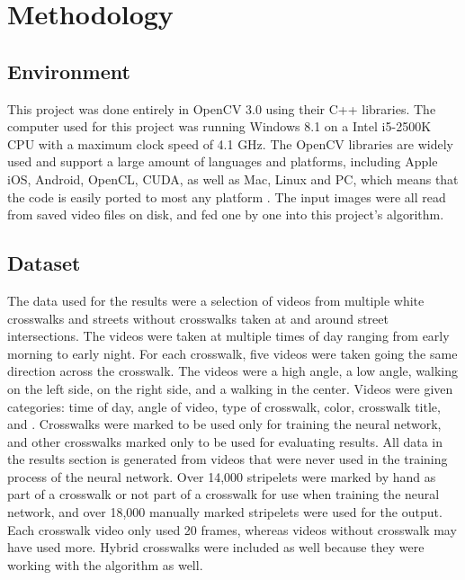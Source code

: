 \documentclass[12pt]{ucthesis}
\begin{document}
\section{Methodology}

\subsection{Environment}
This project was done entirely in OpenCV 3.0 using their C++ libraries. The computer used for this project was running Windows 8.1 on a Intel i5-2500K CPU with a maximum clock speed of 4.1 GHz. The OpenCV libraries are widely used and support a large amount of languages and platforms, including Apple iOS, Android, OpenCL, CUDA, as well as Mac, Linux and PC, which means that the code is easily ported to most any platform \cite{OpenCVPlatforms}. The input images were all read from saved video files on disk, and fed one by one into this project's algorithm. 

\subsection{Dataset}
The data used for the results were a selection of videos from multiple white crosswalks and streets without crosswalks taken at and around street intersections. The videos were taken at multiple times of day ranging from early morning to early night. For each crosswalk, five videos were taken going the same direction across the crosswalk. The videos were a high angle, a low angle, walking on the left side, on the right side, and a walking in the center.  Videos were given categories: time of day, angle of video, type of crosswalk, color, crosswalk title, and . Crosswalks were marked to be used only for training the neural network, and other crosswalks marked only to be used for evaluating results. All data in the results section is generated from videos that were never used in the training process of the neural network. Over 14,000 stripelets were marked by hand as part of a crosswalk or not part of a crosswalk for use when training the neural network, and over 18,000 manually marked stripelets were used for the output. Each crosswalk video only used 20 frames, whereas videos without crosswalk may have used more. Hybrid crosswalks were included as well because they were working with the algorithm as well. 


\end{document}
